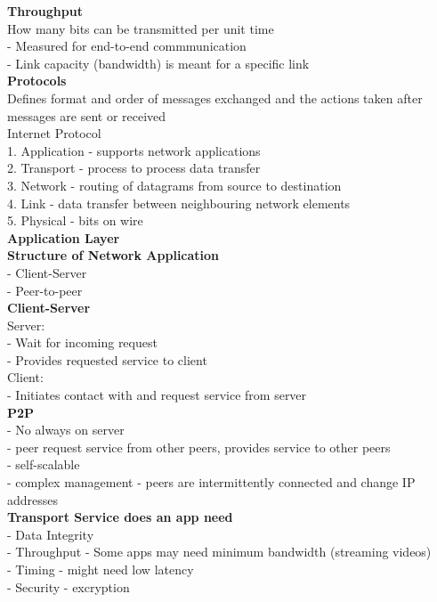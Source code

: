 \documentclass[10pt, a4paper]{article}
\newcommand{\blue}[1]{{\color{MidnightBlue}#1}}
\newcommand{\red}[1]{{\color{red}#1}}
\begin{document}
\begin{multicols*}{3}
		\textbf{Throughput}\\
		How many bits can be transmitted per unit time\\
		- Measured for \red{end-to-end} commmunication\\
		- \red{Link capacity (bandwidth)} is meant for a \red{specific link}\\

		\textbf{Protocols}\\
		Defines \blue{format} and \blue{order} of messages exchanged and the \blue{actions} taken after messages are sent or received\\

		Internet Protocol\\
		1. Application - supports network applications\\
		2. Transport - process to process data transfer\\
		3. Network - routing of datagrams from source to destination\\
		4. Link - data transfer between neighbouring network elements\\
		5. Physical - bits on wire\\

		{\normalsize\textbf{Application Layer}}\\

		\textbf{Structure of Network Application}\\
		- Client-Server\\
		- Peer-to-peer\\

		\textbf{Client-Server}\\
		Server:\\
		- Wait for incoming request\\
		- Provides requested service to client\\
		Client:\\
		- Initiates contact with and request service from server\\

		\textbf{P2P}\\
		- No always on server\\
		- peer request service from other peers, provides service to other peers\\
		- self-scalable\\
		- complex management - peers are intermittently connected and change IP addresses\\

		\textbf{Transport Service does an app need}\\
		- Data Integrity\\
		- Throughput - Some apps may need minimum bandwidth (streaming videos)\\
		- Timing - might need low latency\\
		- Security - excryption\\


\end{multicols*}
\end{document}
